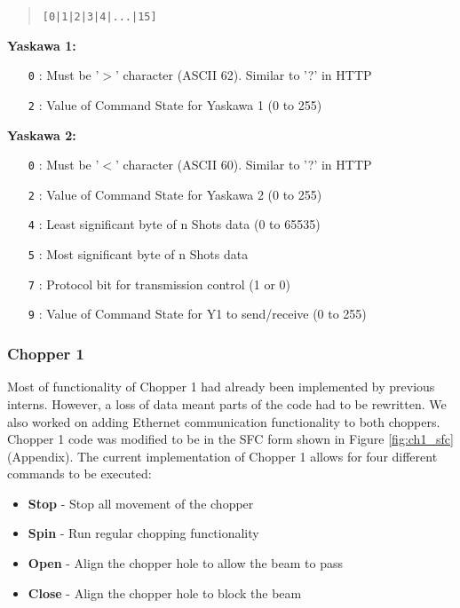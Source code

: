 \documentclass{article}
\begin{document}
            \begin{quote}
                \centering
                \texttt{[0|1|2|3|4|...|15]}
            \end{quote}
            
            \textbf{Yaskawa 1:}
            \begin{itemize}
                \item [\texttt{0}]: Must be '$>$' character (ASCII 62). Similar to '?' in HTTP
                \item [\texttt{2}]: Value of Command State for Yaskawa 1 (0 to 255)
            \end{itemize}
            
            \textbf{Yaskawa 2:}
            \begin{itemize}
                \item [\texttt{0}]: Must be '$<$' character (ASCII 60). Similar to '?' in HTTP
                \item [\texttt{2}]: Value of Command State for Yaskawa 2 (0 to 255)
                \item [\texttt{4}]: Least significant byte of n Shots data (0 to 65535)
                \item [\texttt{5}]: Most significant byte of n Shots data
                \item [\texttt{7}]: Protocol bit for transmission control (1 or 0)
                \item [\texttt{9}]: Value of Command State for Y1 to send/receive (0 to 255)
            \end{itemize}
            
        \subsubsection{Chopper 1}
        
            Most of functionality of Chopper 1 had already been implemented by previous interns. However, a loss of data meant parts of the code had to be rewritten. We also worked on adding Ethernet communication functionality to both choppers. Chopper 1 code was modified to be in the SFC form shown in Figure \ref{fig:ch1_sfc} (Appendix). The current implementation of Chopper 1 allows for four different commands to be executed:
            
            \begin{itemize}
                \item \textbf{Stop} - Stop all movement of the chopper
                \item \textbf{Spin} - Run regular chopping functionality
                \item \textbf{Open} - Align the chopper hole to allow the beam to pass
                \item \textbf{Close} - Align the chopper hole to block the beam
            \end{itemize}
            
\end{document}
